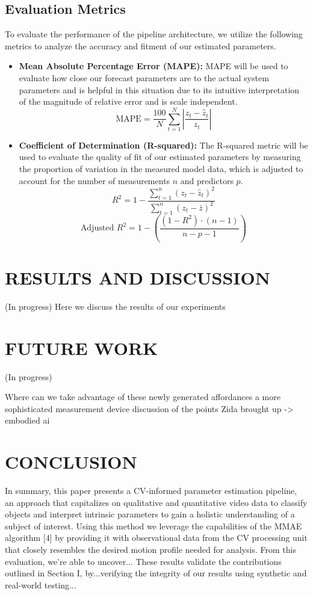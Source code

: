 \documentclass[letterpaper, 10 pt, conference]{ieeeconf}  %
\begin{document}
\subsection{Evaluation Metrics}
To evaluate the performance of the pipeline architecture, we utilize the following metrics to analyze the accuracy and fitment of our estimated parameters. 
\begin{itemize}
    \item \textbf{Mean Absolute Percentage Error (MAPE):} MAPE will be used to evaluate how close our forecast parameters are to the actual system parameters and is helpful in this situation due to its intuitive interpretation of the magnitude of relative error and is scale independent.
    $$\text{MAPE} = \frac{100}{N} \sum_{t=1}^{N} \left| \frac{z_t - \hat{z}_t}{z_t} \right|$$
    \item \textbf{Coefficient of Determination (R-squared):} The R-squared metric will be used to evaluate the quality of fit of our estimated parameters by measuring the proportion of variation in the measured model data, which is adjusted to account for the number of measurements $n$ and predictors $p$.
    $$R^2 = 1 - \frac{\sum_{t=1}^{n} (z_t - \hat{z}_t)^2}{\sum_{t=1}^{n} (z_t - \bar{z})^2}$$
    $$\text{Adjusted } R^2 = 1 - \left( \frac{(1 - R^2) \cdot (n - 1)}{n - p - 1} \right)$$
\end{itemize}

\section{RESULTS AND DISCUSSION}
(In progress) Here we discuss the results of our experiments


\section{FUTURE WORK}
(In progress)

Where can we take advantage of these newly generated affordances
a more sophisticated measurement device
discussion of the points Zida brought up -> embodied ai
\section{CONCLUSION}
In summary, this paper presents a CV-informed parameter estimation pipeline, an approach that capitalizes on qualitative and quantitative video data to classify objects and interpret intrinsic parameters to gain a holistic understanding of a subject of interest. Using this method we leverage the capabilities of the MMAE algorithm [4] by providing it with observational data from the CV processing unit that closely resembles the desired motion profile needed for analysis. From this evaluation, we're able to uncover... These results validate the contributions outlined in Section I, by...verifying the integrity of our results using synthetic and real-world testing...
\end{document}
